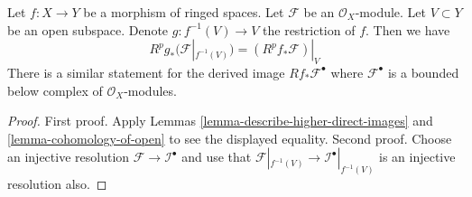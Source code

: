 \begin{lemma}
\label{lemma-localize-higher-direct-images}
Let $f : X \to Y$ be a morphism of ringed spaces.
Let $\mathcal{F}$ be an $\mathcal{O}_X$-module.
Let $V \subset Y$ be an open subspace.
Denote $g : f^{-1}(V) \to V$ the restriction of $f$.
Then we have
$$
R^pg_*(\mathcal{F}|_{f^{-1}(V)}) = (R^pf_*\mathcal{F})|_V
$$
There is a similar statement for the
derived image $Rf_*\mathcal{F}^\bullet$ where $\mathcal{F}^\bullet$
is a bounded below complex of $\mathcal{O}_X$-modules.
\end{lemma}

\begin{proof}
First proof. Apply Lemmas \ref{lemma-describe-higher-direct-images}
and \ref{lemma-cohomology-of-open} to see the displayed equality.
Second proof. Choose an injective resolution
$\mathcal{F} \to \mathcal{I}^\bullet$
and use that $\mathcal{F}|_{f^{-1}(V)} \to \mathcal{I}^\bullet|_{f^{-1}(V)}$
is an injective resolution also.
\end{proof}

